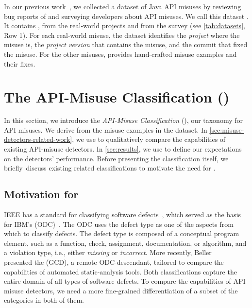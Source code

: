 In our previous work~\cite{ANNN+16}, we collected a dataset of Java API misuses by reviewing bug reports of  and surveying developers about API misuses.
We call this dataset \MUBench.
It contains ,  from the real-world projects and  from the survey (see \autoref{tab:datasets}, Row 1).
For each real-world misuse, the dataset identifies the \emph{project} where the misuse is, the \emph{project version} that contains the misuse, and the commit that fixed the misuse.
For the other misuses, \MUBench provides hand-crafted misuse examples and their fixes.

\begin{table}[tb]
  \centering
  
  \label{tab:datasets}
\end{table}



\section{The API-Misuse Classification (\MUC)} %
\label{sec:api_misuses}

In this section, we introduce the  \emph{API-Misuse Classification} (\MUC), our taxonomy for API misuses.
We derive \MUC from the misuse examples in the \MUBench dataset.
In \autoref{sec:misuse-detectors-related-work}, we use \MUC to qualitatively compare the capabilities of existing API-misuse detectors.
In \autoref{sec:results}, we use \MUC to define our expectations on the detectors' performance.
Before presenting the classification itself, we briefly~discuss existing related classifications to motivate the need for \MUC.

\subsection{Motivation for \MUC}

IEEE has a standard for classifying software defects~\cite{IEEE10}, which served as the basis for IBM’s  (ODC)~\cite{CBCHMRW92}.
The ODC uses the defect type as one of the aspects from which to classify defects.
The defect type is composed of a conceptual program element, such as a function, check, assignment, documentation, or algorithm, and a violation type, i.e., either \emph{missing} or \emph{incorrect}.
%
More recently, Beller~\etal~\cite{BBMZ16} presented the  (GCD), a remote ODC-descendant, tailored to compare the capabilities of automated static-analysis tools.
%
Both classifications capture the entire domain of all types of software defects.
To compare the capabilities of API-misuse detectors, we need a more fine-grained differentiation of a subset of the categories in both of them.

